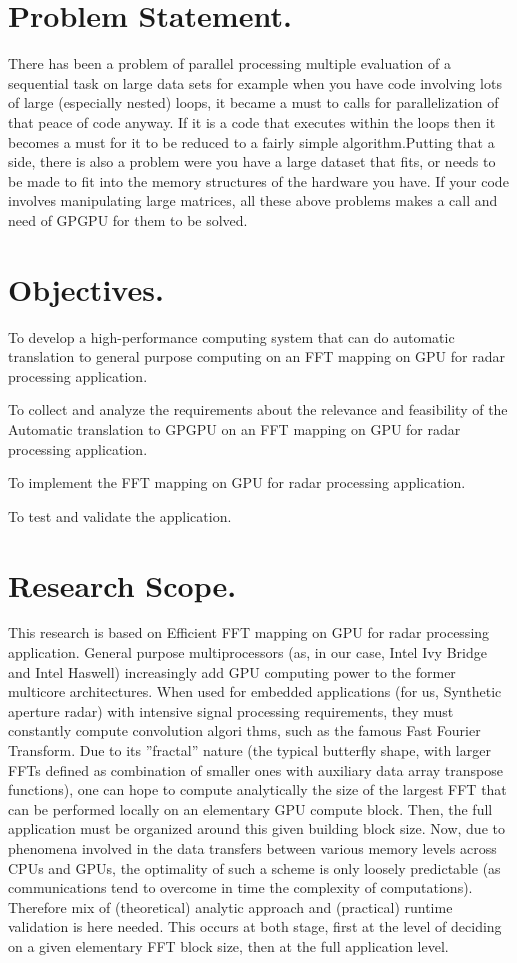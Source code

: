 \documentclass{article}
\begin{document}
\section{Problem Statement.}
{There has been a problem of parallel processing multiple evaluation of a sequential task on large
data sets for example when you have code involving lots of large (especially nested) loops, it became
a must to calls for parallelization of that peace of code anyway. If it is a code that executes within
the loops then it becomes a must for it to be reduced to a fairly simple algorithm.Putting that a
side, there is also a problem were you have a large dataset that fits, or needs to be made to fit into
the memory structures of the hardware you have. If your code involves manipulating large matrices,
all these above problems makes a call and need of GPGPU for them to be solved.
}

\section{Objectives.}
{To develop a high-performance computing system that can do automatic translation to general
purpose computing on an FFT mapping on GPU for radar processing application.

To collect and analyze the requirements about the relevance and feasibility of the Automatic translation
to GPGPU on an FFT mapping on GPU for radar processing application.

To implement the FFT mapping on GPU for radar processing application.

To test and validate the application.
}

\section{Research Scope.}
{This research is based on Efficient FFT mapping on GPU for radar processing application. General purpose
multiprocessors (as, in our case, Intel Ivy Bridge and Intel Haswell) increasingly add GPU
computing power to the former multicore architectures. When used for embedded applications (for
us, Synthetic aperture radar) with intensive signal processing requirements, they must constantly
compute convolution algori thms, such as the famous Fast Fourier Transform. Due to its ”fractal”
nature (the typical butterfly shape, with larger FFTs defined as combination of smaller ones with
auxiliary data array transpose functions), one can hope to compute analytically the size of the largest
FFT that can be performed locally on an elementary GPU compute block. Then, the full application
must be organized around this given building block size. Now, due to phenomena involved in the
data transfers between various memory levels across CPUs and GPUs, the optimality of such a
scheme is only loosely predictable (as communications tend to overcome in time the complexity of
computations). Therefore  mix of (theoretical) analytic approach and (practical) runtime validation
is here needed. This occurs at both stage, first at the level of deciding on a given elementary FFT
block size, then at the full application level.
}
\end{document}
